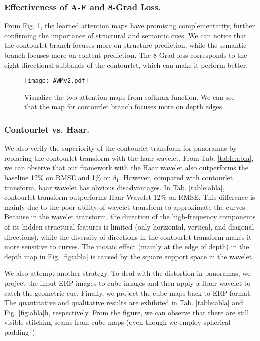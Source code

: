 \documentclass[10pt,times,mathptm,psfig,twocolumn,journals]{IEEEtran}
\begin{document}
\subsubsection{Effectiveness of A-F and 8-Grad Loss.}
From Fig. \ref{fig:AFdistribute}, the learned attention maps have promising complementarity, further confirming the importance of structural and semantic cues. We can notice that the contourlet branch focuses more on structure prediction, while the semantic branch focuses more on content prediction. The 8-Grad loss corresponds to the eight directional subbands of the contourlet, which can make it perform better. 
\begin{figure}[!h]
\centering
\texttt{[image: AWMv2.pdf]}
\caption{Visualize the two attention maps from softmax function. We can see that the map for contourlet branch  focuses more on depth edges.}
\label{fig:AFdistribute}
\end{figure}
\subsubsection{Contourlet vs. Haar.}\label{CvsH} We also verify the superiority of the contourlet transform for panoramas by replacing the contourlet transform with the haar wavelet. From Tab. \ref{table:abla}, we can observe that our framework with the Haar wavelet also outperforms the baseline 12\% on RMSE and 1\% on $\delta_{1}$. However, compared with contourlet transform, haar wavelet has obvious disadvantages. In Tab. \ref{table:abla}, contourlet transform outperforms Haar Wavelet 12\% on RMSE. This difference is mainly due to the poor ability of wavelet transform to approximate the curves. Because in the wavelet transform, the direction of the high-frequency components of its hidden structural features is limited (only horizontal, vertical, and diagonal directions), while the diversity of directions in the contourlet transform makes it more sensitive to curves. The mosaic effect (mainly at the edge of depth) in the depth map in Fig. \ref{fig:abla} is caused by the square support space in the wavelet.

We also attempt another strategy. To deal with the distortion in panoramas, we project the input ERP images to cube images and then apply a Haar wavelet to catch the geometric cue. Finally, we project the cube maps back to ERP format. The quantitative and qualitative results are exhibited in Tab. \ref{table:abla} and Fig. \ref{fig:abla}h, respectively. From the figure, we can observe that there are still visible stitching seams from cube maps (even though we employ spherical padding~\cite{2020BiFuse}). 
\end{document}
